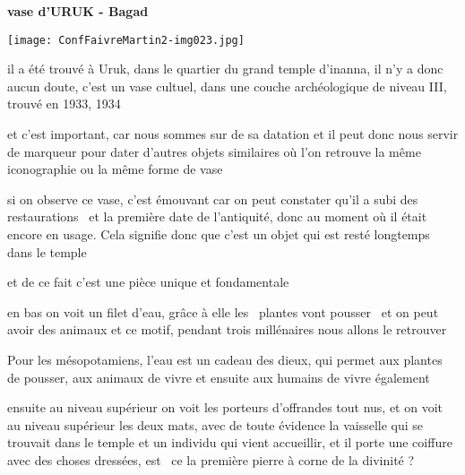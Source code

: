 \documentclass[a4paper]{article}
\begin{document}
\bigskip


\bigskip


\bigskip


\bigskip


\bigskip


\bigskip


\bigskip


\bigskip


\bigskip


\bigskip

{
\textbf{vase d'URUK - Bagad\ \ }}


\bigskip


\bigskip

 \texttt{[image: ConfFaivreMartin2-img023.jpg]} 


\bigskip


\bigskip


\bigskip

{
il a été trouvé à Uruk, dans le quartier du grand temple d'inanna, il n'y a donc aucun doute, c'est un vase cultuel,
dans une couche archéologique de niveau III, trouvé en 1933, 1934}


\bigskip

{
et c'est important, car nous sommes sur de sa datation et il peut donc nous servir de marqueur pour dater d'autres
objets similaires où l'on retrouve la même iconographie ou la même forme de vase}


\bigskip

{
si on observe ce vase, c'est émouvant car on peut constater qu'il a subi des restaurations \ et la première date de
l'antiquité, donc au moment où il était encore en usage. Cela signifie donc que c'est un objet qui est resté longtemps
dans le temple}

{
et de ce fait c'est une pièce unique et fondamentale}


\bigskip

{
en bas on voit un filet d'eau, grâce à elle les \ plantes vont pousser \ et on peut avoir des animaux et ce motif,
pendant trois millénaires nous allons le retrouver}

{
Pour les mésopotamiens, l'eau est un cadeau des dieux, qui permet aux plantes de pousser, aux animaux de vivre et
ensuite aux humains de vivre également}


\bigskip

{
ensuite au niveau supérieur on voit les porteurs d'offrandes tout nus, et on voit au niveau supérieur les deux mats,
avec de toute évidence la vaisselle qui se trouvait dans le temple et un individu qui vient accueillir, et il porte une
coiffure avec des choses dressées, est \ ce la première pierre à corne de la divinité ?}
\end{document}

